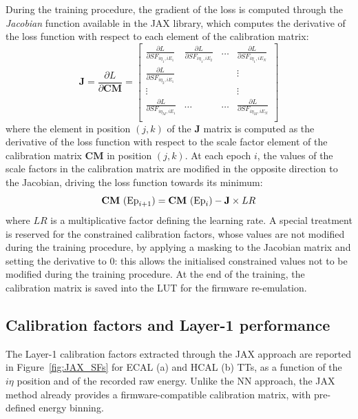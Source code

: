 \bigbreak

During the training procedure, the gradient of the loss is computed through the \textit{Jacobian} function available in the JAX library, which computes the derivative of the loss function with respect to each element of the calibration matrix:
\begin{equation}
    \textbf{J} = \frac{\partial L}{\partial \textbf{CM}} = \begin{bmatrix} 
    \frac{\partial L}{\partial SF_{i\eta_1,iE_1}} & \frac{\partial L}{\partial SF_{i\eta_1,iE_2}} & \dots & \frac{\partial L}{\partial SF_{i\eta_1,iE_N}} \\
    \frac{\partial L}{\partial SF_{i\eta_2,iE_1}} & & & \vdots \\
    \vdots & & & \vdots \\
    \frac{\partial L}{\partial SF_{i\eta_M,iE_1}} & \dots & \dots & \frac{\partial L}{\partial SF_{i\eta_M,iE_N}} \\
    \end{bmatrix}
\end{equation}
where the element in position $(j,k)$ of the $\textbf{J}$ matrix is computed as the derivative of the loss function with respect to the scale factor element of the calibration matrix $\textbf{CM}$ in position $(j,k)$.
At each epoch $i$, the values of the scale factors in the calibration matrix are modified in the opposite direction to the Jacobian, driving the loss function towards its minimum:
\begin{equation}
    \textbf{CM}~(\textnormal{Ep}_{i+1}) = \textbf{CM}~(\textnormal{Ep}_i) - \textbf{J} \times LR 
\end{equation}
where $LR$ is a multiplicative factor defining the learning rate.
A special treatment is reserved for the constrained calibration factors, whose values are not modified during the training procedure, by applying a masking to the Jacobian matrix and setting the derivative to 0: this allows the initialised constrained values not to be modified during the training procedure.
At the end of the training, the calibration matrix is saved into the LUT for the firmware re-emulation.

\subsection{Calibration factors and Layer-1 performance}

The Layer-1 calibration factors extracted through the JAX approach are reported in Figure~\ref{fig:JAX_SFs} for ECAL (a) and HCAL (b) TTs, as a function of the $i\eta$ position and of the recorded raw energy. Unlike the NN approach, the JAX method already provides a firmware-compatible calibration matrix, with pre-defined energy binning.

